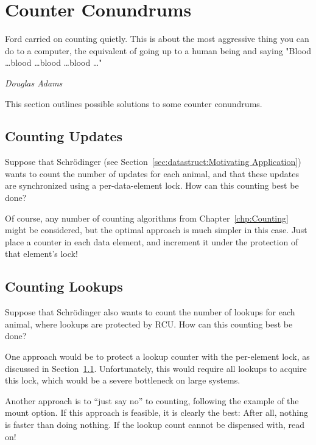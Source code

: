 
\section{Counter Conundrums}
\label{sec:together:Counter Conundrums}
%
\epigraph{Ford carried on counting quietly.
	  This is about the most aggressive thing you can do to a
	  computer, the equivalent of going up to a human being and saying
	  "Blood \dots blood \dots blood \dots blood \dots"}
	 {\emph{Douglas Adams}}

This section outlines possible solutions to some counter conundrums.

\subsection{Counting Updates}
\label{sec:together:Counting Updates}

Suppose that Schr\"odinger (see
Section~\ref{sec:datastruct:Motivating Application})
wants to count the number of updates for each animal,
and that these updates are synchronized using a per-data-element lock.
How can this counting best be done?

Of course, any number of counting algorithms from
Chapter~\ref{chp:Counting}
might be considered, but the optimal approach is much simpler in this case.
Just place a counter in each data element, and increment it under the
protection of that element's lock!

\subsection{Counting Lookups}
\label{sec:together:Counting Lookups}

Suppose that Schr\"odinger also wants to count the number of lookups for
each animal, where lookups are protected by RCU.
How can this counting best be done?

One approach would be to protect a lookup counter with the per-element
lock, as discussed in
Section~\ref{sec:together:Counting Updates}.
Unfortunately, this would require all lookups to acquire this lock,
which would be a severe bottleneck on large systems.

Another approach is to ``just say no'' to counting, following the example
of the  mount option.
If this approach is feasible, it is clearly the best:  After all, nothing
is faster than doing nothing.
If the lookup count cannot be dispensed with, read on!

